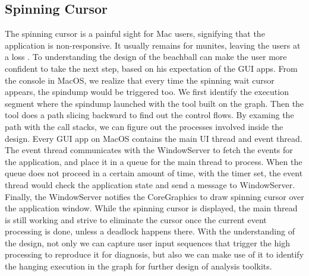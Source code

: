 \subsection{Spinning Cursor}
The spinning cursor is a painful sight for Mac users, signifying that the application is non-responsive.
It usually remains for munites, leaving the users at a loss .                    
To understanding the design of the beachball can make the user more confident to take the next step, based on his expectation of the GUI apps.
From the console in MacOS, we realize that every time the spinning wait cursor appears, the spindump would be triggered too.
We first identify the execution segment where the spindump launched with the tool built on the graph.
Then the tool does a path slicing backward to find out the control flows.                       
By examing the path with the call stacks, we can figure out the processes involved inside the design.
Every GUI app on MacOS contains the main UI thread and event thread.                           
The event thread communicates with the WindowServer to fetch the events for the application, and place it in a queue for the main thread to process.
When the queue does not proceed in a certain amount of time, with the timer set, the event thread would check the application state and send a message to WindowServer. 
Finally, the WindowServer notifies the CoreGraphics to draw spinning cursor over the application window.                 
While the spinning cursor is displayed, the main thread is still working and strive to eliminate the cursor once the current event processing is done, unless a deadlock happens there.
With the understanding of the design, not only we can capture user input sequences that trigger the high processing to reproduce it for diagnosis, but also we can make use of it to identify the hanging execution in the graph for further design of analysis toolkits.
